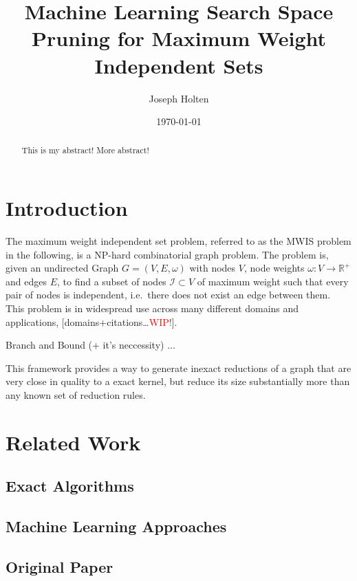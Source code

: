 \documentclass[acmsmall,nonacm,screen,review]{acmart}
\title{Machine Learning Search Space Pruning for Maximum Weight Independent Sets}
\author{Joseph Holten}
\affiliation{%
  \institution{Heidelberg University}
  \streetaddress{Im Neuenheimer Feld 205}
  \city{Heidelberg}
  \state{Baden-Württemberg}
  \country{Germany}
  \postcode{69120}
}
\date{\today}
\newcommand{\R}{\mathbb{R}}
\newcommand{\wip}{\textcolor{red}{WIP!}}
\begin{document}
\begin{abstract}
    This is my abstract! More abstract!
\end{abstract}
\maketitle


\section{Introduction}
The maximum weight independent set problem, referred to as the MWIS problem in the following, is a NP-hard \cite{christian-exact-mwis} combinatorial graph problem. 
The problem is, given an undirected Graph $G=(V, E, \omega)$ with nodes $V$, node weights $\omega : V \rightarrow \R^+$ and edges $E$, to find a subset of nodes $\mathcal{I} \subset V$ of maximum weight such that every pair of nodes is independent, i.e.\ there does not exist an edge between them. 
This problem is in widespread use across many different domains and applications, [domains+citations\ldots \wip].

Branch and Bound (+ it's neccessity) ...

This framework provides a way to generate inexact reductions of a graph that are very close in quality to a exact kernel, but reduce its size substantially more than any known set of reduction rules.

\section{Related Work}
\subsection{Exact Algorithms}
\subsection{Machine Learning Approaches}
\subsection{Original Paper}

\end{document}
